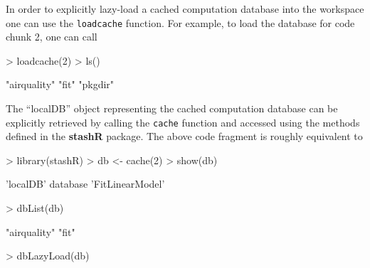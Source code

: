 \documentclass{article}
\newcommand{\code}{\texttt}
\newcommand{\pkg}{\textbf}
\begin{document}

In order to explicitly lazy-load a cached computation database into
the workspace one can use the \code{loadcache} function.  For example,
to load the database for code chunk 2, one can call
\begin{Schunk}
\begin{Sinput}
> loadcache(2)
> ls()
\end{Sinput}
\begin{Soutput}
[1] "airquality" "fit"        "pkgdir"    
\end{Soutput}
\end{Schunk}

The ``localDB'' object representing the cached computation database
can be explicitly retrieved by calling the \code{cache} function and
accessed using the methods defined in the \pkg{stashR} package.  The
above code fragment is roughly equivalent to
\begin{Schunk}
\begin{Sinput}
> library(stashR)
> db <- cache(2)
> show(db)
\end{Sinput}
\begin{Soutput}
'localDB' database 'FitLinearModel'
\end{Soutput}
\begin{Sinput}
> dbList(db)
\end{Sinput}
\begin{Soutput}
[1] "airquality" "fit"       
\end{Soutput}
\begin{Sinput}
> dbLazyLoad(db)
\end{Sinput}
\end{Schunk}
\end{document}
